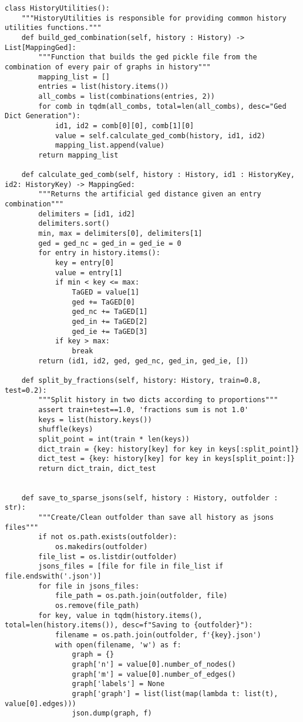 \begin{lstlisting}[label={code:history_utilities}, caption={History Utilities}]
class HistoryUtilities():
	"""HistoryUtilities is responsible for providing common history utilities functions."""
	def build_ged_combination(self, history : History) -> List[MappingGed]:
		"""Function that builds the ged pickle file from the combination of every pair of graphs in history"""
		mapping_list = []
		entries = list(history.items())
		all_combs = list(combinations(entries, 2))
		for comb in tqdm(all_combs, total=len(all_combs), desc="Ged Dict Generation"):
			id1, id2 = comb[0][0], comb[1][0]
			value = self.calculate_ged_comb(history, id1, id2)
			mapping_list.append(value)
		return mapping_list
	
	def calculate_ged_comb(self, history : History, id1 : HistoryKey, id2: HistoryKey) -> MappingGed:
		"""Returns the artificial ged distance given an entry combination"""
		delimiters = [id1, id2]
		delimiters.sort()
		min, max = delimiters[0], delimiters[1]
		ged = ged_nc = ged_in = ged_ie = 0
		for entry in history.items():
			key = entry[0]
			value = entry[1]
			if min < key <= max:
				TaGED = value[1]
				ged += TaGED[0]
				ged_nc += TaGED[1]
				ged_in += TaGED[2]
				ged_ie += TaGED[3]
			if key > max:
				break
		return (id1, id2, ged, ged_nc, ged_in, ged_ie, [])
	
	def split_by_fractions(self, history: History, train=0.8, test=0.2):
		"""Split history in two dicts according to proportions"""
		assert train+test==1.0, 'fractions sum is not 1.0'
		keys = list(history.keys())
		shuffle(keys)
		split_point = int(train * len(keys))
		dict_train = {key: history[key] for key in keys[:split_point]}
		dict_test = {key: history[key] for key in keys[split_point:]}
		return dict_train, dict_test
	
	
	def save_to_sparse_jsons(self, history : History, outfolder : str):
		"""Create/Clean outfolder than save all history as jsons files"""
		if not os.path.exists(outfolder):
			os.makedirs(outfolder)
		file_list = os.listdir(outfolder)
		jsons_files = [file for file in file_list if file.endswith('.json')]
		for file in jsons_files:
			file_path = os.path.join(outfolder, file)
			os.remove(file_path)
		for key, value in tqdm(history.items(), total=len(history.items()), desc=f"Saving to {outfolder}"):
			filename = os.path.join(outfolder, f'{key}.json')
			with open(filename, 'w') as f:
				graph = {}
				graph['n'] = value[0].number_of_nodes()
				graph['m'] = value[0].number_of_edges()
				graph['labels'] = None
				graph['graph'] = list(list(map(lambda t: list(t), value[0].edges)))
				json.dump(graph, f)	
\end{lstlisting}